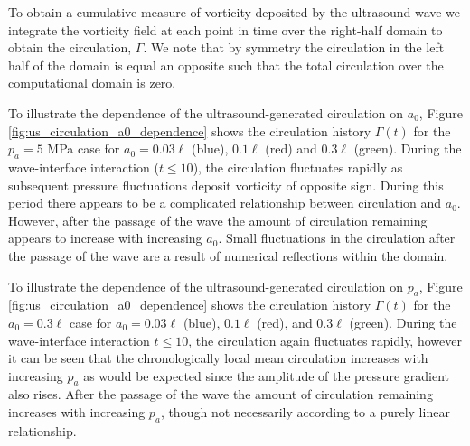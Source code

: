 %
To obtain a cumulative measure of vorticity deposited by the
ultrasound wave we integrate the vorticity field at each point in time
over the right-half domain to obtain the circulation, $\Gamma$. We
note that by symmetry the circulation in the left half of the domain
is equal an opposite such that the total circulation over the
computational domain is zero.

To illustrate the dependence of the ultrasound-generated circulation
on $a_0$, Figure \ref{fig:us_circulation_a0_dependence} shows the
circulation history $\Gamma(t)$ for the $p_a = 5$ MPa case for
$a_0 = 0.03\ell$ (blue), $0.1\ell$ (red) and $0.3\ell$ (green). During
the wave-interface interaction ($t \leq 10$), the circulation
fluctuates rapidly as subsequent pressure fluctuations deposit
vorticity of opposite sign. During this period there appears to be a
complicated relationship between circulation and $a_0$. However, after
the passage of the wave the amount of circulation remaining appears to
increase with increasing $a_0$. Small fluctuations in the circulation
after the passage of the wave are a result of numerical reflections
within the domain.

To illustrate the dependence of the ultrasound-generated circulation
on $p_a$, Figure \ref{fig:us_circulation_a0_dependence} shows the
circulation history $\Gamma(t)$ for the $a_0 = 0.3\ell$ case for
$a_0 = 0.03\ell$ (blue), $0.1\ell$ (red), and $0.3\ell$
(green). During the wave-interface interaction $t \leq 10$, the
circulation again fluctuates rapidly, however it can be seen that the
chronologically local mean circulation increases with increasing $p_a$
as would be expected since the amplitude of the pressure gradient also
rises. After the passage of the wave the amount of circulation
remaining increases with increasing $p_a$, though not necessarily
according to a purely linear relationship.

